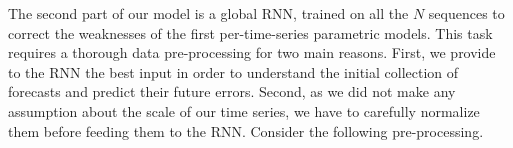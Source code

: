 \documentclass{article} %
\newcommand{\ts}{y}
\newcommand{\fullts}{{\bf \ts}}
\newcommand{\tspred}{\hat{\ts}}
\newcommand{\stat}{f}
\newcommand{\statparam}{\theta_{predictor}}
\newcommand{\lag}{h}
\newcommand{\predictor}{\mathrm{RNN}_p}
\newcommand{\classifier}{\mathrm{RNN}_c}
\newcommand{\remainder}{r}
\newcommand{\hiddenregime}{U}
\begin{document}
The second part of our model is a global RNN, trained on all the $N$ sequences to correct the weaknesses of the first per-time-series parametric models. This task requires a thorough data pre-processing for two main reasons. First, we provide  to the RNN the best input in order to understand the initial collection of forecasts and predict their future errors. Second, as we did not make any assumption about the scale of our time series, we have to carefully normalize them before feeding them to the RNN.
Consider the following pre-processing. 


\end{document}
